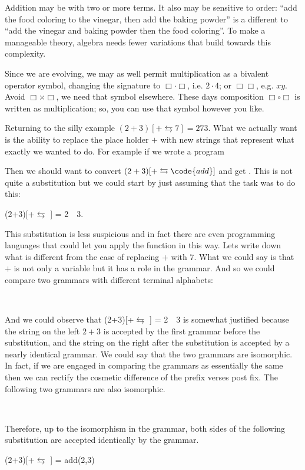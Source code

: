 Addition  may be with two or more terms.  It also may be 
sensitive to order: ``add the food coloring to the vinegar, then add the baking
powder'' is a different to ``add the vinegar and baking powder then the
food coloring''.  To make a manageable theory, algebra needs fewer variations that 
build towards this complexity.

Since we are evolving, we may as well permit multiplication as a bivalent operator
symbol, changing the signature to $\Box \cdot \Box$, i.e. $2\cdot 4$; or
$\Box\Box$, e.g. $xy$.   Avoid $\Box\times \Box$, we need that symbol elsewhere.
These days composition $\Box\circ\Box$ is written as multiplication; so, you can
use that symbol however you like.  


Returning to the silly example 
$(2+3)[+\leftrightarrows 7]=273$.
What we actually want is the ability to replace the place holder $+$ with 
new strings that represent what exactly we wanted to do.  For example 
if we wrote a program 
\begin{center}
\end{center}
Then we should want to convert $(2+3)[+\leftrightarrows \code{add}]$ and get 
.  This is not quite a substitution but we could start by 
just assuming that the task was to do this:
\begin{center}
    (2+3)[+$\leftrightarrows$ ] = 2~~3.
\end{center}
This substitution is less suspicious and in fact there are even programming 
languages that could let you apply the function  in this way.
Lets write down what is different from the case of replacing $+$ with $7$.
What we could say is that $+$ is not only a variable but it has a role 
in the grammar.  And so we could compare two grammars with different terminal 
alphabets:
\begin{center}
\\
\end{center}
And we could observe that 
(2+3)[+$\leftrightarrows$ ] = 2~~3 is somewhat 
justified because the string on the left $2+3$ is accepted by the first grammar 
before the substitution, and the string on the right after the substitution 
is accepted by a nearly identical grammar.  We could say that the two grammars 
are isomorphic.  In fact, if we are engaged in comparing the grammars as 
essentially the same then we can rectify the cosmetic difference of the prefix 
verses post fix.  The following two grammars are also isomorphic.
\begin{center}
\\
\end{center}
Therefore, up to the isomorphism in the grammar, both sides of the following 
substitution are accepted identically by the grammar.
\begin{center}
    (2+3)[+$\leftrightarrows$ ] = add(2,3)
\end{center}


